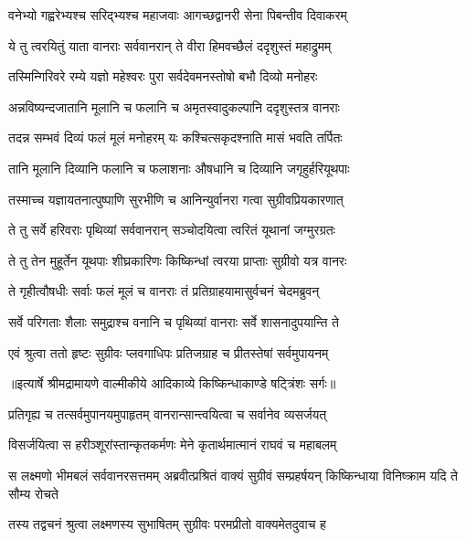 \twolineshloka
{वनेभ्यो गह्वरेभ्यश्च सरिद्भ्यश्च महाजवाः}
{आगच्छद्वानरी सेना पिबन्तीव दिवाकरम्} %

\twolineshloka
{ये तु त्वरयितुं याता वानराः सर्ववानरान्}
{ते वीरा हिमवच्छैलं ददृशुस्तं महाद्रुमम्} %

\twolineshloka
{तस्मिन्गिरिवरे रम्ये यज्ञो महेश्वरः पुरा}
{सर्वदेवमनस्तोषो बभौ दिव्यो मनोहरः} %

\twolineshloka
{अन्नविष्यन्दजातानि मूलानि च फलानि च}
{अमृतस्वादुकल्पानि ददृशुस्तत्र वानराः} %

\twolineshloka
{तदन्न सम्भवं दिव्यं फलं मूलं मनोहरम्}
{यः कश्चित्सकृदश्नाति मासं भवति तर्पितः} %

\twolineshloka
{तानि मूलानि दिव्यानि फलानि च फलाशनाः}
{औषधानि च दिव्यानि जगृहुर्हरियूथपाः} %

\twolineshloka
{तस्माच्च यज्ञायतनात्पुष्पाणि सुरभीणि च}
{आनिन्युर्वानरा गत्वा सुग्रीवप्रियकारणात्} %

\twolineshloka
{ते तु सर्वे हरिवराः पृथिव्यां सर्ववानरान्}
{सञ्चोदयित्वा त्वरितं यूथानां जग्मुरग्रतः} %

\twolineshloka
{ते तु तेन मुहूर्तेन यूथपाः शीघ्रकारिणः}
{किष्किन्धां त्वरया प्राप्ताः सुग्रीवो यत्र वानरः} %

\twolineshloka
{ते गृहीत्वौषधीः सर्वाः फलं मूलं च वानराः}
{तं प्रतिग्राहयामासुर्वचनं चेदमब्रुवन्} %

\twolineshloka
{सर्वे परिगताः शैलाः समुद्राश्च वनानि च}
{पृथिव्यां वानराः सर्वे शासनादुपयान्ति ते} %

\twolineshloka
{एवं श्रुत्वा ततो हृष्टः सुग्रीवः प्लवगाधिपः}
{प्रतिजग्राह च प्रीतस्तेषां सर्वमुपायनम्} %


{॥इत्यार्षे श्रीमद्रामायणे वाल्मीकीये आदिकाव्ये किष्किन्धाकाण्डे षट्त्रिंशः सर्गः॥}


\twolineshloka
{प्रतिगृह्य च तत्सर्वमुपानयमुपाहृतम्}
{वानरान्सान्त्वयित्वा च सर्वानेव व्यसर्जयत्} %

\twolineshloka
{विसर्जयित्वा स हरीञ्शूरांस्तान्कृतकर्मणः}
{मेने कृतार्थमात्मानं राघवं च महाबलम्} %

\threelineshloka
{स लक्ष्मणो भीमबलं सर्ववानरसत्तमम्}
{अब्रवीत्प्रश्रितं वाक्यं सुग्रीवं सम्प्रहर्षयन्}
{किष्किन्धाया विनिष्क्राम यदि ते सौम्य रोचते} %

\twolineshloka
{तस्य तद्वचनं श्रुत्वा लक्ष्मणस्य सुभाषितम्}
{सुग्रीवः परमप्रीतो वाक्यमेतदुवाच ह} %


